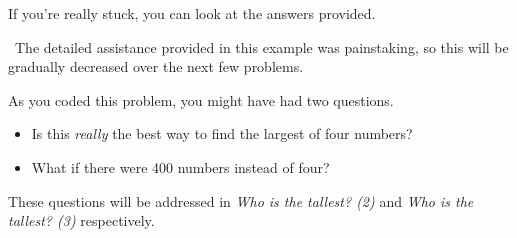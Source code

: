 If you're really stuck, you can look at the answers provided.

\Afterword\ The detailed assistance provided in this example was painstaking, so this will
be gradually decreased over the next few problems.

As you coded this problem, you might have had two questions.
\begin{itemize}
    \item Is this \emph{really} the best way to find the largest of four numbers?
    \item What if there were 400 numbers instead of four?
\end{itemize}

These questions will be addressed in \emph{Who is the tallest? (2)} and \emph{Who is the
tallest? (3)} respectively.

